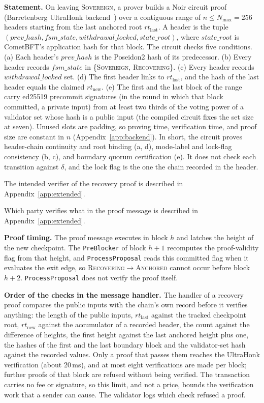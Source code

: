 \textbf{Statement.} On leaving \textsc{Sovereign}, a prover builds a
Noir circuit proof (Barretenberg UltraHonk
backend~\cite{aztec_noir_barretenberg,gabizon2019plonk}) over a contiguous
range of $n \leq N_{\max} = 256$ headers starting from the last anchored root
$\mathit{rt}_{\text{last}}$. A header is the tuple $(\mathit{prev\_hash},
\mathit{fsm\_state}, \mathit{withdrawal\_locked}, \mathit{state\_root})$,
where $\mathit{state\_root}$ is CometBFT's application hash for that block.
The circuit checks five conditions. (a) Each header's
$\mathit{prev\_hash}$ is the Poseidon2 hash of its predecessor. (b) Every header
records $\mathit{fsm\_state}$ in \{\textsc{Sovereign}, \textsc{Recovering}\}. (c) Every
header records $\mathit{withdrawal\_locked}$ set. (d) The first header links to
$\mathit{rt}_{\text{last}}$, and the hash of the last header equals the claimed
$\mathit{rt}_{\text{new}}$. (e) The first and the last block of the range carry
ed25519 precommit signatures (in the round in which that block committed, a private input) from at least two thirds of the voting power
of a validator set whose hash is a public input (the compiled circuit fixes the set
size at seven). Unused slots are padding, so proving time, verification time, and
proof size are constant in $n$ (Appendix~\ref{app:backend}). In short, the circuit
proves header-chain continuity and root binding (a, d), mode-label and lock-flag
consistency (b, c), and boundary quorum certification (e). It does not check each
transition against $\delta$, and the lock flag is the one the chain recorded in the
header.

The intended verifier of the recovery proof is described in Appendix~\ref{app:extended}.

Which party verifies what in the proof message is described in Appendix~\ref{app:extended}.

\textbf{Proof timing.} The proof message executes in block $h$ and latches the
height of the new checkpoint. The \texttt{PreBlocker} of block $h{+}1$
recomputes the proof-validity flag from that height, and
\texttt{ProcessProposal} reads this committed flag when it evaluates the exit
edge, so \textsc{Recovering}$\to$\textsc{Anchored} cannot occur before block
$h{+}2$.
\texttt{ProcessProposal} does not verify the proof itself.

\textbf{Order of the checks in the message handler.} The handler of a recovery proof compares the public inputs with the chain's own record before it verifies anything: the length of the public inputs, $rt_{\text{last}}$ against the tracked checkpoint root, $rt_{\text{new}}$ against the accumulator of a recorded header, the count against the difference of heights, the first height against the last anchored height plus one, the hashes of the first and the last boundary block and the validator-set hash against the recorded values. Only a proof that passes them reaches the UltraHonk verification (about 20\,ms), and at most eight verifications are made per block; further proofs of that block are refused without being verified. The transaction carries no fee or signature, so this limit, and not a price, bounds the verification work that a sender can cause. The validator logs which check refused a proof.

